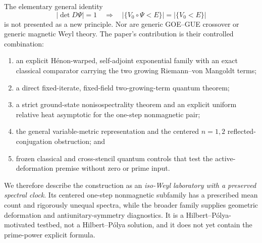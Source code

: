 The elementary general identity
\[
 |\det D\Psi|=1
 \quad\Longrightarrow\quad
 |\{V_0\circ\Psi<E\}|=|\{V_0<E\}|
\]
is not presented as a new principle.  Nor are generic GOE--GUE crossover or
generic magnetic Weyl theory.  The paper's contribution is their controlled
combination:
\begin{enumerate}[label=(\alph*),leftmargin=8mm]
 \item an explicit H\'enon-warped, self-adjoint exponential family with an
 exact classical comparator carrying the two growing
 Riemann--von Mangoldt terms;
 \item a direct fixed-iterate, fixed-field two-growing-term quantum theorem;
 \item a strict ground-state nonisospectrality theorem and an explicit
 uniform relative heat asymptotic for the one-step nonmagnetic pair;
 \item the general variable-metric representation and the centered
 \(n=1,2\) reflected-conjugation obstruction; and
 \item frozen classical and cross-stencil quantum controls that test the
 active-deformation premise without zero or prime input.
\end{enumerate}
We therefore describe the construction as an \emph{iso-Weyl laboratory with
a preserved spectral clock}.  Its centered one-step nonmagnetic subfamily
has a prescribed mean count and rigorously unequal spectra, while the broader
family supplies geometric deformation and antiunitary-symmetry diagnostics.
It is a Hilbert--P\'olya-motivated testbed, not a Hilbert--P\'olya solution,
and it does not yet contain the prime-power explicit formula.
